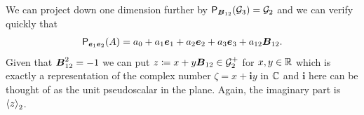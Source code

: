 \documentclass{article}
\begin{document}
\begin{example}
We can project down one dimension further by $\projection_{\bivector_{12}} (\G_3) = \G_2$ and
we can verify quickly that
\begin{subequations}
\begin{align}
    \projection_{\blade{e}_1 \blade{e}_2}(A) =  a_0 + a_1 \blade{e}_1 + a_2 \blade{e}_2 + a_3 \blade{e}_3 + a_{12} \bivector_{12}.
\end{align}
\end{subequations}
Given that $\blade{B}_{12}^2=-1$ we can put $z \coloneqq x + y \blade{B}_{12} \in \G_2^+$ for $x,y\in \R$ which is exactly a representation of the complex number $\zeta = x+ \mathbf{i}y$ in $\C$ and $\mathbf{i}$ here can be thought of as the unit pseudoscalar in the plane. Again, the imaginary part is $\proj{2}{z}$.
\end{example}

%






\end{document}
